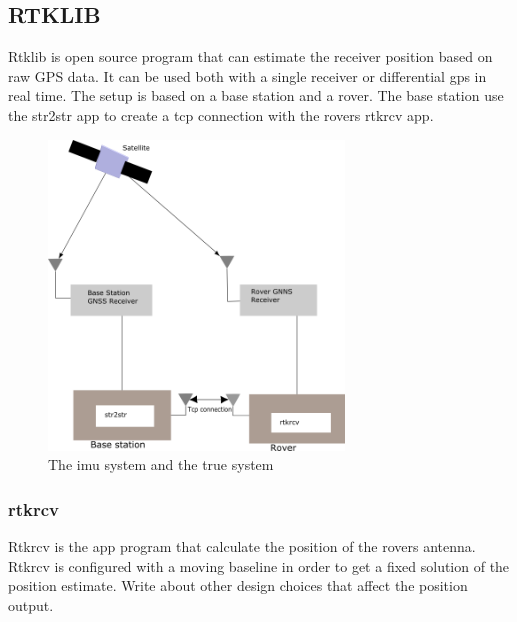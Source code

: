 \subsection{RTKLIB}
Rtklib is open source program that can estimate the receiver position based on raw GPS data. It can be used both with a single receiver or differential gps in real time. The setup is based on a base station and a rover. The base station use the str2str app to create a tcp connection with the rovers rtkrcv app.
\begin{figure}[H]
	\centering
		\includegraphics[width=0.7\textwidth]{figs/Rtklib_structure.png}
		\caption{The imu system and the true system}
		\label{figure:IMUSys}
\end{figure}
\subsubsection{rtkrcv}
Rtkrcv is the app program that calculate the position of the rovers antenna. Rtkrcv is configured with a moving baseline in order to get a fixed solution of the position estimate. Write about other design choices that affect the position output. 

